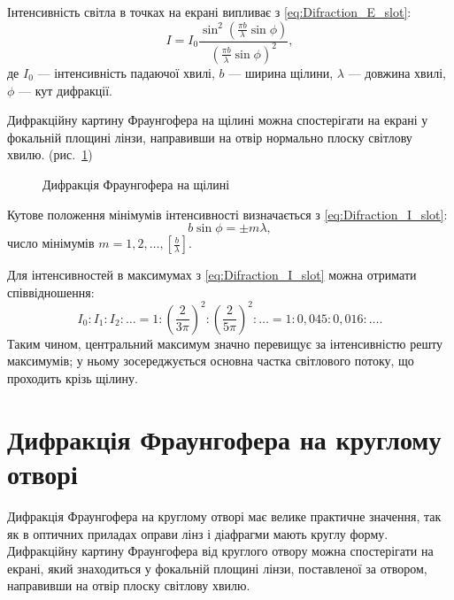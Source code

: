 Інтенсивність світла в точках на екрані випливає з \eqref{eq:Difraction_E_slot}:
\begin{equation}\label{eq:Difraction_I_slot}
    I = I_0 \frac{\sin^2\left( {\frac{\pi b}{\lambda} \sin\phi}\right)}{\left( \frac{\pi b}{\lambda} \sin\phi\right)^2},
\end{equation}
де $I_0$ --- інтенсивність падаючої хвилі, $b$ --- ширина щілини, $\lambda$ --- довжина хвилі, $\phi$ --- кут дифракції.


Дифракційну картину Фраунгофера на щілині можна спостерігати на екрані у фокальній площині лінзи, направивши на отвір нормально плоску світлову хвилю.
(рис.~\ref{pic:slot})

\begin{figure}[h!]\centering
    
    \caption{Дифракція Фраунгофера на щілині}
    \label{pic:slot}
\end{figure}



Кутове положення мінімумів інтенсивності визначається з \eqref{eq:Difraction_I_slot}:
\begin{equation}\label{eq:Difraction_Slot_min}
    b\sin\phi=\pm m\lambda,
\end{equation}
число мінімумів $m = 1, 2, \ldots, \left[ \frac{b}{\lambda}\right]$.

Для інтенсивностей в максимумах з  \eqref{eq:Difraction_I_slot} можна отримати співвідношення:
\begin{equation}\label{}
    I_0:I_1:I_2:\ldots = 1:\left(\frac{2}{3\pi}\right)^2:\left(\frac{2}{5\pi}\right)^2:\ldots = 1:0,045:0,016:\ldots.
\end{equation}
Таким чином, центральний максимум значно перевищує
за інтенсивністю решту максимумів; у ньому зосереджується
основна частка світлового потоку, що проходить крізь щілину.


\section{Дифракція Фраунгофера на круглому отворі}


%
Дифракція Фраунгофера на круглому отворі має велике практичне значення, так як в оптичних приладах оправи лінз і діафрагми мають круглу форму. Дифракційну картину Фраунгофера від круглого отвору можна спостерігати на екрані, який знаходиться у фокальній площині лінзи, поставленої за отвором, направивши на отвір плоску світлову хвилю.

